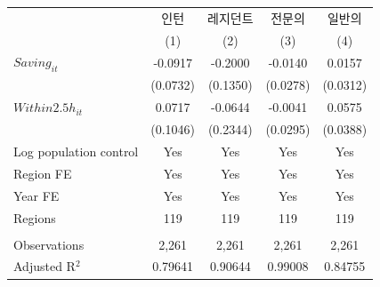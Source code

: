 \begingroup
\centering
\begin{tabular}{lcccc}
   \toprule
                          & 인턴     & 레지던트 & 전문의   & 일반의 \\   
                          & (1)      & (2)      & (3)      & (4)\\  
   \midrule 
   $Saving_{it}$          & -0.0917  & -0.2000  & -0.0140  & 0.0157\\   
                          & (0.0732) & (0.1350) & (0.0278) & (0.0312)\\   
   $Within2.5h_{it}$      & 0.0717   & -0.0644  & -0.0041  & 0.0575\\   
                          & (0.1046) & (0.2344) & (0.0295) & (0.0388)\\   
   Log population control & Yes      & Yes      & Yes      & Yes\\  
   Region FE              & Yes      & Yes      & Yes      & Yes\\  
   Year FE                & Yes      & Yes      & Yes      & Yes\\  
   Regions                & 119      & 119      & 119      & 119\\  
    \\
   Observations           & 2,261    & 2,261    & 2,261    & 2,261\\  
   Adjusted R$^2$         & 0.79641  & 0.90644  & 0.99008  & 0.84755\\  
   \bottomrule
\end{tabular}
\par\endgroup
